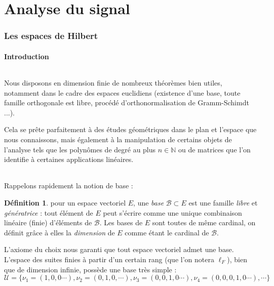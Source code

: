 \documentclass[]{article}
\theoremstyle{remark}
\theoremstyle{definition}
\newtheorem{mydef}{Définition}
\begin{document}
	\part{Analyse du signal}
	\section{Les espaces de Hilbert}
	\subsection{Introduction}

	\paragraph*{}
	
	Nous disposons en dimension finie de nombreux théorèmes bien utiles, notamment dans le cadre des espaces euclidiens (existence d'une base, toute famille orthogonale est libre, procédé d'orthonormalisation de Gramm-Schimdt ...).
	
	Cela se prête parfaitement à des études géométriques dans le plan et l'espace que nous connaissons, mais également à la manipulation de certains objets de l'analyse tels que les polynômes de degré au plus $n \in \mathbb{N}$ ou de matrices que l'on identifie à certaines applications linéaires.
	
	\paragraph*{}
	
	Rappelons rapidement la notion de base :
	
	\begin{mydef}
		pour un espace vectoriel $E$, une \textit{base} $\mathcal{B} \subset E$ est une famille \textit{libre} et \textit{génératrice} : tout élément de $E$ peut s'écrire comme une unique combinaison linéaire (finie) d'éléments de $\mathcal{B}$. Les bases de $E$ sont toutes de même cardinal, on définit grâce à elles la \textit{dimension} de $E$ comme étant le cardinal de $\mathcal{B}$.
	\end{mydef}
	
	L'axiome du choix nous garanti que tout espace vectoriel admet une base. L'espace des suites finies à partir d'un certain rang (que l'on notera $\ell_F$), bien que de dimension infinie, possède une base très simple : $$\mathcal{U} = \{\nu_1 = (1, 0, 0 \cdots), \nu_2 = (0, 1, 0, \cdots), \nu_3 = (0, 0, 1, 0 \cdots), \nu_4 = (0, 0, 0, 1, 0 \cdots), \cdots\}$$
	
\end{document}
